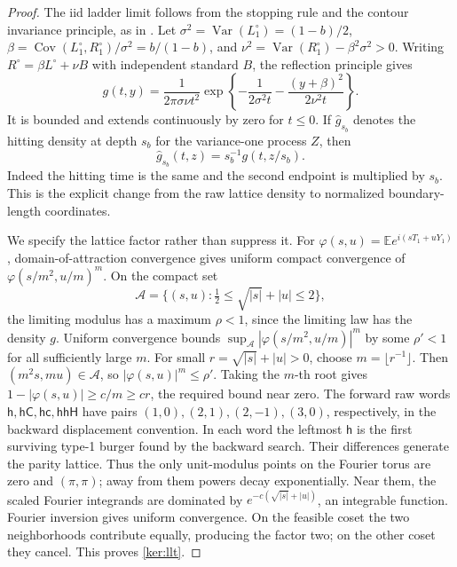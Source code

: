 \documentclass[11pt]{article}
\numberwithin{equation}{section}
\theoremstyle{definition}
\theoremstyle{remark}
\newcommand{\1}{\mathbf 1}
\begin{document}
\begin{proof}
The iid ladder limit follows from the stopping rule and the contour
invariance principle, as in \cite[Section~2.1]{GwynneSunFKII}.
Let \(\sigma^2=\operatorname{Var}(L_1^\circ)=(1-b)/2\),
\(\beta=\operatorname{Cov}(L_1^\circ,R_1^\circ)/\sigma^2=b/(1-b)\),
and \(\nu^2=\operatorname{Var}(R_1^\circ)-\beta^2\sigma^2>0\).
Writing \(R^\circ=\beta L^\circ+\nu B\) with independent standard
\(B\), the
reflection principle gives
\begin{equation}
 g(t,y)=\frac{1}{2\pi\sigma\nu t^2}
  \exp\!\left\{-\frac{1}{2\sigma^2t}
              -\frac{(y+\beta)^2}{2\nu^2t}\right\}.
 \label{ker:hit-density}
\end{equation}
It is bounded and extends continuously by zero for \(t\le0\).
If \(\widehat g_{s_b}\) denotes the hitting density at depth \(s_b\)
for the variance-one process \(Z\), then
\begin{equation}\label{ker:hitting-units}
 \widehat g_{s_b}(t,z)=s_b^{-1}g(t,z/s_b).
\end{equation}
Indeed the hitting time is the same and the second endpoint is
multiplied by \(s_b\).  This is the explicit change from the raw
lattice density to normalized boundary-length coordinates.

We specify the lattice factor rather than suppress it.
For \(\varphi(s,u)=\mathbb E e^{i(sT_1+uY_1)}\), domain-of-attraction
convergence gives uniform compact convergence of
\(\varphi(s/m^2,u/m)^m\).
On the compact set
\[
 \mathcal A=\{(s,u):\tfrac12\le\sqrt{|s|}+|u|\le2\},
\]
the limiting modulus has a maximum \(\rho<1\), since the limiting
law has the density \(g\).  Uniform convergence bounds
\(\sup_{\mathcal A}|\varphi(s/m^2,u/m)|^m\) by some
\(\rho'<1\) for all sufficiently large \(m\).
For small \(r=\sqrt{|s|}+|u|>0\), choose \(m=\lfloor r^{-1}\rfloor\).
Then \((m^2s,mu)\in\mathcal A\), so
\(|\varphi(s,u)|^m\le\rho'\).  Taking the \(m\)-th root gives
\(1-|\varphi(s,u)|\ge c/m\ge cr\), the required bound near zero.
The forward raw words
\(\mathsf h,\mathsf h\mathsf C,\mathsf h\mathsf c,
\mathsf h\mathsf h\mathsf H\)
have pairs \((1,0),(2,1),(2,-1),(3,0)\), respectively, in the
backward displacement convention.  In each word the leftmost
\(\mathsf h\) is the first surviving type-1 burger found by the
backward search.
Their differences generate the parity lattice.  Thus the only
unit-modulus points on the Fourier torus are zero and \((\pi,\pi)\);
away from them powers decay exponentially.  Near them, the scaled
Fourier integrands are dominated by
\(e^{-c(\sqrt{|s|}+|u|)}\), an integrable function.
Fourier inversion gives uniform convergence.  On the feasible coset
the two neighborhoods contribute equally, producing the factor two;
on the other coset they cancel.  This proves \eqref{ker:llt}.


\end{proof}
\end{document}
